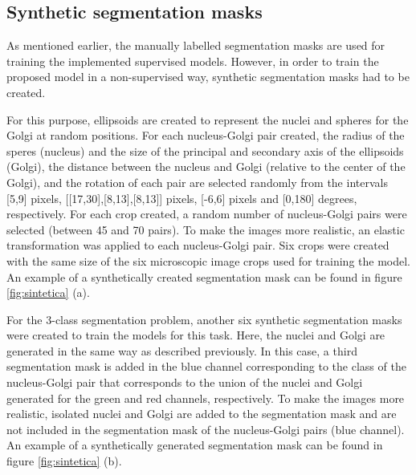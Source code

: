 \subsection{Synthetic segmentation masks}
\label{subsection:synthetic_masks}

As mentioned earlier, the manually labelled segmentation masks are used for training the implemented supervised models. However, in order to train the proposed model in a non-supervised way, synthetic segmentation masks had to be created. 

For this purpose, ellipsoids are created to represent the nuclei and spheres for the Golgi at random positions. For each nucleus-Golgi pair created, the radius of the speres (nucleus) and the size of the principal and secondary axis of the ellipsoids (Golgi), the distance between the nucleus and Golgi (relative to the center of the Golgi), and the rotation of each pair are selected randomly from the intervals [5,9] pixels, [[17,30],[8,13],[8,13]] pixels, [-6,6] pixels and [0,180] degrees, respectively. For each crop created, a random number of nucleus-Golgi pairs were selected (between 45 and 70 pairs). To make the images more realistic, an elastic transformation was applied to each nucleus-Golgi pair. Six crops were created with the same size of the six microscopic image crops used for training the model. An example of a synthetically created segmentation mask can be found in figure \ref{fig:sintetica} (a).

For the 3-class segmentation problem, another six synthetic segmentation masks were created to train the models for this task. Here, the nuclei and Golgi are generated in the same way as described previously. In this case, a third segmentation mask is added in the blue channel corresponding to the class of the nucleus-Golgi pair that corresponds to the union of the nuclei and Golgi generated for the green and red channels, respectively. To make the images more realistic, isolated nuclei and Golgi are added to the segmentation mask and are not included in the segmentation mask of the nucleus-Golgi pairs (blue channel). An example of a synthetically generated segmentation mask can be found in figure \ref{fig:sintetica} (b).


